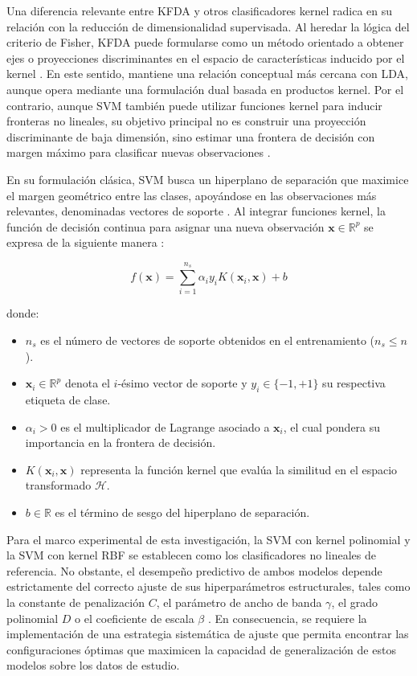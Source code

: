 Una diferencia relevante entre KFDA y otros clasificadores kernel radica en su relación con la reducción de dimensionalidad supervisada. Al heredar la lógica del criterio de Fisher, KFDA puede formularse como un método orientado a obtener ejes o proyecciones discriminantes en el espacio de características inducido por el kernel \cite{baudat2000generalized}. En este sentido, mantiene una relación conceptual más cercana con LDA, aunque opera mediante una formulación dual basada en productos kernel. Por el contrario, aunque SVM también puede utilizar funciones kernel para inducir fronteras no lineales, su objetivo principal no es construir una proyección discriminante de baja dimensión, sino estimar una frontera de decisión con margen máximo para clasificar nuevas observaciones \cite{scholkopf2001learning}.

En su formulación clásica, SVM busca un hiperplano de separación que maximice el margen geométrico entre las clases, apoyándose en las observaciones más relevantes, denominadas vectores de soporte \cite{cortes1995support}. Al integrar funciones kernel, la función de decisión continua para asignar una nueva observación $\mathbf{x} \in \mathbb{R}^p$ se expresa de la siguiente manera \cite{hastie2009elements}:


\begin{equation}
	f(\mathbf{x}) = \sum_{i = 1}^{n_s} \alpha_i y_i K(\mathbf{x}_i, \mathbf{x}) + b
	\label{eq:EMT19}
\end{equation}

donde:

\begin{itemize}
	\item $n_s$ es el número de vectores de soporte obtenidos en el entrenamiento ($n_s \le n$).
	\item $\mathbf{x}_i \in \mathbb{R}^p$ denota el $i$-ésimo vector de soporte y $y_i \in \{-1, +1\}$ su respectiva etiqueta de clase.
	\item $\alpha_i > 0$ es el multiplicador de Lagrange asociado a $\mathbf{x}_i$, el cual pondera su importancia en la frontera de decisión.
	\item $K(\mathbf{x}_i, \mathbf{x})$ representa la función kernel que evalúa la similitud en el espacio transformado $\mathcal{H}$.
	\item $b \in \mathbb{R}$ es el término de sesgo del hiperplano de separación.
\end{itemize}

Para el marco experimental de esta investigación, la SVM con kernel polinomial y la SVM con kernel RBF se establecen como los clasificadores no lineales de referencia. No obstante, el desempeño predictivo de ambos modelos depende estrictamente del correcto ajuste de sus hiperparámetros estructurales, tales como la constante de penalización $C$, el parámetro de ancho de banda $\gamma$, el grado polinomial $D$ o el coeficiente de escala $\beta$ \cite{chapelle2002choosing}. En consecuencia, se requiere la implementación de una estrategia sistemática de ajuste que permita encontrar las configuraciones óptimas que maximicen la capacidad de generalización de estos modelos sobre los datos de estudio.


